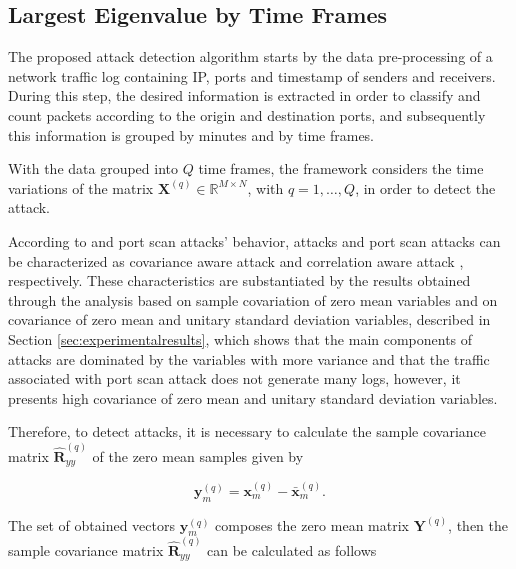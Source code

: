 \documentclass[review]{elsarticle}
\providecommand{\DIFaddtex}[1]{{\protect\color{blue}\uwave{#1}}} %
\providecommand{\DIFaddbegin}{} %
\providecommand{\DIFaddend}{} %
\providecommand{\DIFadd}[1]{\texorpdfstring{\DIFaddtex{#1}}{#1}} %
\begin{document}
\subsection{Largest Eigenvalue by Time Frames}
\label{sec:prop_LargestEigenvaluebyTimeFrames}

The proposed attack detection algorithm starts by the data pre-processing of a network traffic log containing IP, ports and timestamp of senders and receivers. During this step, the desired information is extracted in order to classify and count packets according to the origin and destination ports, and subsequently this information is grouped by minutes and by time frames.

With the data grouped into $Q$ time frames, the framework considers the time variations of the matrix $\boldsymbol{X}^{(q)} \in \mathbb{R}^{M\times{N}}$, with $q = 1, \ldots, Q$, in order to detect the attack. 

According to \DIFaddbegin \DIFadd{flood }\DIFaddend and port scan attacks' behavior, \DIFaddbegin \DIFadd{flood }\DIFaddend attacks and port scan attacks can be characterized as covariance aware attack \citep{jin2004covariance} and correlation aware attack \citep{lakhina2005mining}, respectively. These characteristics are substantiated by the results obtained through the analysis based on sample covariation of zero mean variables and on covariance of zero mean and unitary standard deviation variables, described in Section \ref{sec:experimentalresults}, which shows that the main components of \DIFaddbegin \DIFadd{flood }\DIFaddend attacks are dominated by the variables with more variance and that the traffic associated with port scan attack does not generate many logs, however, it presents high covariance of zero mean and unitary standard deviation variables.

Therefore, to detect \DIFaddbegin \DIFadd{flood }\DIFaddend attacks, it is necessary to calculate the sample covariance matrix $\boldsymbol{\hat{R}}_{yy}^{(q)}$ of the zero mean samples given by

\begin{equation}\label{eq:eq02}
\boldsymbol{y}_{m}^{(q)} = \boldsymbol{x}_{m}^{(q)} - \bar{\boldsymbol{x}}_{m}^{(q)}.
\end{equation}

The set of obtained vectors $\boldsymbol{y}_{m}^{(q)}$ composes the zero mean matrix $\boldsymbol{Y}^{(q)}$, then the sample covariance matrix $\boldsymbol{\hat{R}}_{yy}^{(q)}$ can be calculated as follows
\end{document}
